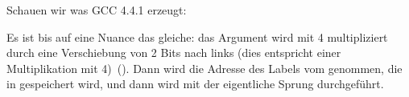 

\label{switch_lot_GCC}

Schauen wir was GCC 4.4.1 erzeugt:



Es ist bis auf eine Nuance das gleiche: das Argument  wird mit 4 multipliziert durch eine Verschiebung von 2
Bits nach links (dies entspricht einer Multiplikation mit 4)~().
Dann wird die Adresse des Labels vom  genommen, die in \EAX gespeichert wird, und dann wird mit
 der eigentliche Sprung durchgeführt.


